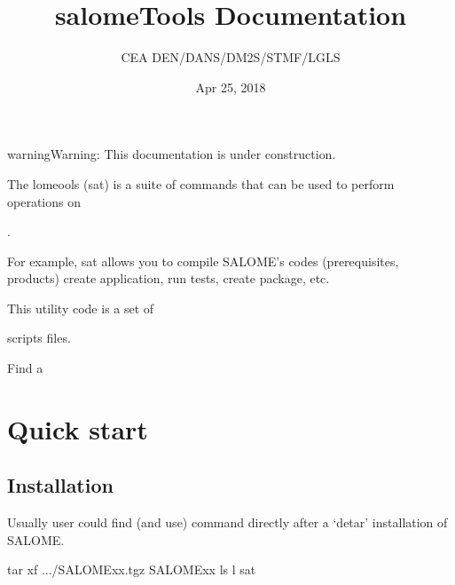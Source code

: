 \documentclass[a4paper,10pt,english]{sphinxmanual}
\title{salomeTools Documentation}
\date{Apr 25, 2018}
\author{CEA DEN/DANS/DM2S/STMF/LGLS}
\begin{document}
\maketitle
\sphinxtableofcontents
{}\label{\detokenize{index::doc}}
\clearpage




\begin{sphinxadmonition}{warning}{Warning:}
This documentation is under construction.
\end{sphinxadmonition}

The lomeools (sat) is a suite of commands
that can be used to perform operations on %
\begin{footnote}[1]\sphinxAtStartFootnote
{}
%
\end{footnote}.

For example, sat allows you to compile SALOME’s codes
(prerequisites, products)
create application, run tests, create package, etc.

This utility code is a set of %
\begin{footnote}[2]\sphinxAtStartFootnote
{}
%
\end{footnote} scripts files.

Find a 


\chapter{Quick start}
\label{\detokenize{index:quick-start}}\label{\detokenize{index:salome-tools}}

\section{Installation}
\label{\detokenize{installation_of_sat:installation}}\label{\detokenize{installation_of_sat::doc}}
Usually user could find (and use) command  directly after a ‘detar’ installation of SALOME.

%
\begin{sphinxVerbatim}[commandchars=\\\{\}]
tar \PYGZhy{}xf .../SALOME\PYGZus{}xx.tgz
 SALOME\PYGZus{}xx
ls \PYGZhy{}l sat      
\end{sphinxVerbatim}
\end{document}
